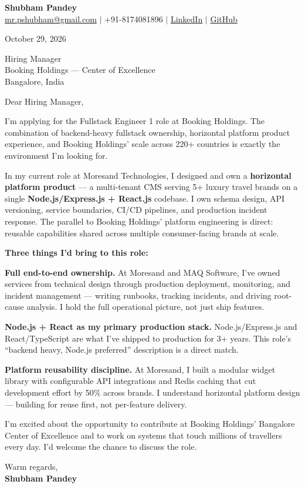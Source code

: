\documentclass[a4paper,11pt]{article}
\begin{document}
\begin{center}
  {\LARGE \textbf{Shubham Pandey}} \\[4pt]
  \href{mailto:mr.pshubham@gmail.com}{mr.pshubham@gmail.com} $|$ +91-8174081896 $|$
  \href{https://www.linkedin.com/in/shubham-pandey-a74716199/}{LinkedIn} $|$
  \href{https://github.com/shubham-pandey12}{GitHub}
\end{center}

\vspace{8pt}
October 29, 2026

\vspace{8pt}
Hiring Manager \\
Booking Holdings --- Center of Excellence \\
Bangalore, India

\vspace{12pt}
Dear Hiring Manager,

I'm applying for the Fullstack Engineer 1 role at Booking Holdings. The combination of backend-heavy fullstack ownership, horizontal platform product experience, and Booking Holdings' scale across 220+ countries is exactly the environment I'm looking for.

In my current role at Moresand Technologies, I designed and own a \textbf{horizontal platform product} --- a multi-tenant CMS serving 5+ luxury travel brands on a single \textbf{Node.js/Express.js + React.js} codebase. I own schema design, API versioning, service boundaries, CI/CD pipelines, and production incident response. The parallel to Booking Holdings' platform engineering is direct: reusable capabilities shared across multiple consumer-facing brands at scale.

\textbf{Three things I'd bring to this role:}

\textbf{Full end-to-end ownership.} At Moresand and MAQ Software, I've owned services from technical design through production deployment, monitoring, and incident management --- writing runbooks, tracking incidents, and driving root-cause analysis. I hold the full operational picture, not just ship features.

\textbf{Node.js + React as my primary production stack.} Node.js/Express.js and React/TypeScript are what I've shipped to production for 3+ years. This role's ``backend heavy, Node.js preferred'' description is a direct match.

\textbf{Platform reusability discipline.} At Moresand, I built a modular widget library with configurable API integrations and Redis caching that cut development effort by 50\% across brands. I understand horizontal platform design --- building for reuse first, not per-feature delivery.

I'm excited about the opportunity to contribute at Booking Holdings' Bangalore Center of Excellence and to work on systems that touch millions of travellers every day. I'd welcome the chance to discuss the role.

\vspace{12pt}
Warm regards, \\
\textbf{Shubham Pandey}
\end{document}
